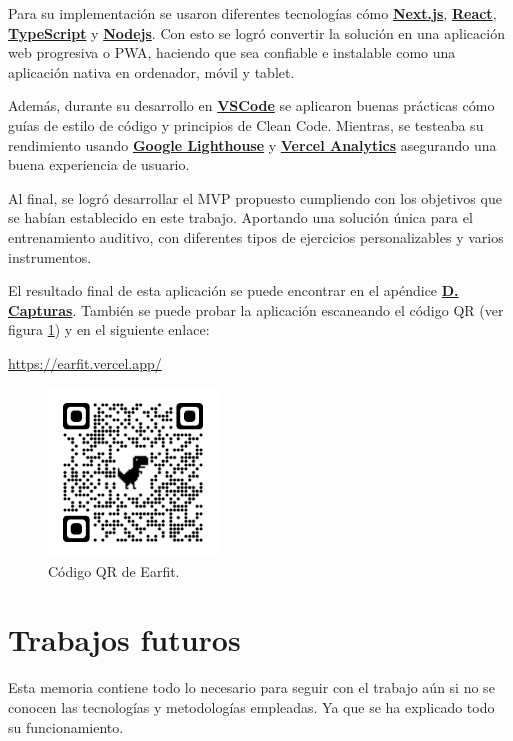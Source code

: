 \documentclass[12pt,twoside,titlepage]{report}
\begin{document}
Para su implementación se usaron diferentes tecnologías cómo \hyperref[sec:Next]{\textbf{Next.js}}, \hyperref[sec:React]{\textbf{React}}, \hyperref[sec:TypeScript]{\textbf{TypeScript}} y \hyperref[sec:Node]{\textbf{Nodejs}}. Con esto se logró convertir la solución en una aplicación web progresiva o PWA, haciendo que sea confiable e instalable como una aplicación nativa en ordenador, móvil y tablet. 

Además, durante su desarrollo en \hyperref[sec:VSCode]{\textbf{VSCode}} se aplicaron buenas prácticas cómo guías de estilo de código y principios de Clean Code. Mientras, se testeaba su rendimiento usando \hyperref[sec:lighthouse]{\textbf{Google Lighthouse}} y \hyperref[sec:analytics]{\textbf{Vercel Analytics}} asegurando una buena experiencia de usuario.

Al final, se logró desarrollar el MVP propuesto cumpliendo con los objetivos que se habían establecido en este trabajo. Aportando una solución única para el entrenamiento auditivo, con diferentes tipos de ejercicios personalizables y varios instrumentos. 

El resultado final de esta aplicación se puede encontrar en el apéndice \hyperref[sec:Capturas]{\textbf{D. Capturas}}. También se puede probar la aplicación escaneando el código QR (ver figura \ref{fig:EarfitQR}) y en el siguiente enlace: 

\url{https://earfit.vercel.app/}

\begin{figure}[H]
    \centering
    \includegraphics[width=0.4\textwidth]{Conclusiones/EarfitQR}
    \caption{Código QR de Earfit.}
    \label{fig:EarfitQR}
\end{figure}

\section{Trabajos futuros}

Esta memoria contiene todo lo necesario para seguir con el trabajo aún si no se conocen las tecnologías y metodologías empleadas. Ya que se ha explicado todo su funcionamiento.
\end{document}
